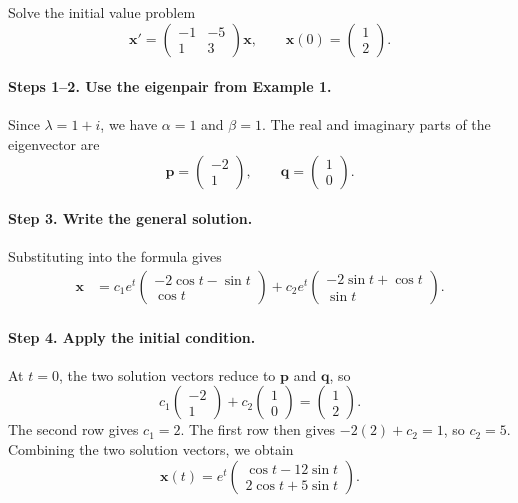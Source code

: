\documentclass[11pt,letterpaper]{article}
\begin{document}
\begin{example}[2]{
Solve the initial value problem
\[
    \mathbf{x}'=
    \begin{pmatrix}-1&-5\\1&3\end{pmatrix}\mathbf{x},
    \qquad
    \mathbf{x}(0)=\begin{pmatrix}1\\2\end{pmatrix}.
\]
}

\paragraph{Steps 1--2. Use the eigenpair from Example 1.}
Since $\lambda=1+i$, we have $\alpha=1$ and $\beta=1$.
The real and imaginary parts of the eigenvector are
\[
    \mathbf{p}=\begin{pmatrix}-2\\1\end{pmatrix},
    \qquad
    \mathbf{q}=\begin{pmatrix}1\\0\end{pmatrix}.
\]

\paragraph{Step 3. Write the general solution.}
Substituting into the formula gives
\begin{align*}
    \mathbf{x}
    &
      =c_1e^t\begin{pmatrix}-2\cos t-\sin t\\ \cos t\end{pmatrix}
      +c_2e^t\begin{pmatrix}-2\sin t+\cos t\\ \sin t\end{pmatrix}.
\end{align*}

\paragraph{Step 4. Apply the initial condition.}
At $t=0$, the two solution vectors reduce to $\mathbf{p}$ and
$\mathbf{q}$, so
\[
    c_1\begin{pmatrix}-2\\1\end{pmatrix}
    +c_2\begin{pmatrix}1\\0\end{pmatrix}
    =\begin{pmatrix}1\\2\end{pmatrix}.
\]
The second row gives $c_1=2$. The first row then gives
$-2(2)+c_2=1$, so $c_2=5$. Combining the two solution vectors,
we obtain
\[
    \boxed{
    \mathbf{x}(t)
    =e^t\begin{pmatrix}
        \cos t-12\sin t\\
        2\cos t+5\sin t
    \end{pmatrix}.}
\]
\end{example}
\end{document}

